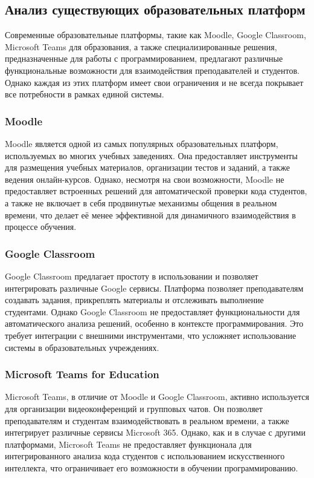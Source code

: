 \subsection{Анализ существующих образовательных платформ}

Современные образовательные платформы, такие как Moodle, Google Classroom, Microsoft Teams для образования, а также специализированные решения, предназначенные для работы с программированием, предлагают различные функциональные возможности для взаимодействия преподавателей и студентов. Однако каждая из этих платформ имеет свои ограничения и не всегда покрывает все потребности в рамках единой системы.

\subsubsection{Moodle}
Moodle является одной из самых популярных образовательных платформ, используемых во многих учебных заведениях. Она предоставляет инструменты для размещения учебных материалов, организации тестов и заданий, а также ведения онлайн-курсов. Однако, несмотря на свои возможности, Moodle не предоставляет встроенных решений для автоматической проверки кода студентов, а также не включает в себя продвинутые механизмы общения в реальном времени, что делает её менее эффективной для динамичного взаимодействия в процессе обучения.

\subsubsection{Google Classroom}
Google Classroom предлагает простоту в использовании и позволяет интегрировать различные Google сервисы. Платформа позволяет преподавателям создавать задания, прикреплять материалы и отслеживать выполнение студентами. Однако Google Classroom не предоставляет функциональности для автоматического анализа решений, особенно в контексте программирования. Это требует интеграции с внешними инструментами, что усложняет использование системы в образовательных учреждениях.

\subsubsection{Microsoft Teams for Education}
Microsoft Teams, в отличие от Moodle и Google Classroom, активно используется для организации видеоконференций и групповых чатов. Он позволяет преподавателям и студентам взаимодействовать в реальном времени, а также интегрирует различные сервисы Microsoft 365. Однако, как и в случае с другими платформами, Microsoft Teams не предоставляет функционала для интегрированного анализа кода студентов с использованием искусственного интеллекта, что ограничивает его возможности в обучении программированию.

